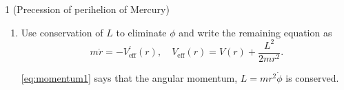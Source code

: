 \documentclass[11pt]{article}
\begin{document}
\begin{problem}{1 (Precession of perihelion of Mercury)}
\begin{enumerate}[label=(\alph*)]
\begin{answer}
			      By repeated application of the Pythagorean identity \( \cos^2\theta + \sin^2\theta = 1 \), we get
			      \begin{equation}
				      \label{eq:20}
				      \mathcal{L} = \frac{1}{2}m (\dot{r}^2 + \dot{\theta}^2 r^2 + \dot{\phi}^2 r^2 \sin^2\theta) - V(\left| \vec{x} \right|).
			      \end{equation}

			      From the Euler-Lagrange equations, \( \frac{\mathrm{d} }{\mathrm{d} t} \frac{\partial \mathcal{L}}{\partial \dot{q}} - \frac{\partial \mathcal{L}}{\partial q} = 0 \), we achieve the equations of motion
            \begin{equation}
			      \begin{aligned}
				      \label{eq:21}
				       & m \ddot{r} = mr(\dot{\theta}^2 + \dot{\phi}^2 \sin^2\theta) - V^{\prime}(r),                                     \\
				       & \frac{\mathrm{d} }{\mathrm{d} t} \left(m \dot{\phi} r^2 \sin^2\theta\right) = 0                                  \\
				       & \frac{\mathrm{d} }{\mathrm{d} t} \left(m \dot{\theta} r^2\right) - m \dot{\phi}^2 r^2 \sin\theta \cos\theta = 0.
			      \end{aligned}
            \end{equation}
			      Setting \( \theta = \frac{\pi}{2} \) makes \( \dot{\theta} = 0\) and thus yields
            \begin{equation}
			      \begin{aligned}
				                           & m \ddot{r} = mr \dot{\phi}^2 - V^{\prime}(r)                        \\
				      \label{eq:momentum1} & \frac{\mathrm{d} }{\mathrm{d} t} \left(m r^2 \dot{\phi}\right) = 0,
			      \end{aligned}
            \end{equation}
			      as desired.
		      \end{answer}
		\item Use conservation of \( L \) to eliminate \(\phi\) and write the remaining equation as
		      \begin{equation}
			      \label{eq:4}
			      m \ddot{r} = -V_{\text{eff}}^{\prime}(r), \quad V_{\text{eff}}(r) = V(r) + \frac{L^2}{2mr^2}.
		      \end{equation}
		      \begin{answer}
			      \cref{eq:momentum1} says that the angular momentum, \( L = m r^2 \dot{\phi} \) is conserved.

\end{answer}
\end{enumerate}
\end{problem}
\end{document}
